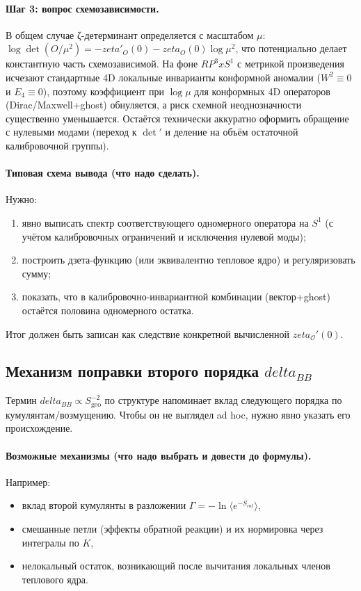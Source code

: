 \documentclass[12pt]{article}
\def\mathbb#1{#1}%
\def\delta{delta}%
\def\times{x}%
\def\zeta{zeta}%
\begin{document}
\paragraph{Шаг 3: вопрос схемозависимости.}
В общем случае ζ-детерминант определяется с масштабом $\mu$:
$\log\det(O/\mu^2)=-\zeta'_O(0)-\zeta_O(0)\log\mu^2$, что потенциально делает константную часть схемозависимой.
На фоне $\mathbb{RP}^3\times S^1$ с метрикой произведения исчезают стандартные 4D локальные инварианты конформной аномалии ($W^2\equiv 0$ и $E_4\equiv 0$), поэтому коэффициент при $\log\mu$ для конформных 4D операторов (Dirac/Maxwell+ghost) обнуляется, а риск схемной неоднозначности существенно уменьшается.
Остаётся технически аккуратно оформить обращение с нулевыми модами (переход к $\det'$ и деление на объём остаточной калибровочной группы).



\paragraph{Типовая схема вывода (что надо сделать).}
Нужно:
\begin{enumerate}
  \item явно выписать спектр соответствующего одномерного оператора на $S^1$ (с учётом калибровочных ограничений и исключения нулевой моды);
  \item построить дзета-функцию (или эквивалентно тепловое ядро) и регуляризовать сумму;
  \item показать, что в калибровочно-инвариантной комбинации (вектор+ghost) остаётся половина одномерного остатка.
\end{enumerate}
Итог должен быть записан как следствие конкретной вычисленной $\zeta_{\mathcal{O}}'(0)$.

\subsection{Механизм поправки второго порядка $\delta_{BB}$}
Термин $\delta_{BB}\propto S_{\mathrm{geo}}^{-2}$ по структуре напоминает вклад следующего порядка по кумулянтам/возмущению.
Чтобы он не выглядел ad hoc, нужно явно указать его происхождение.

\paragraph{Возможные механизмы (что надо выбрать и довести до формулы).}
Например:
\begin{itemize}
  \item вклад второй кумулянты в разложении $\Gamma=-\ln\langle e^{-S_{int}}\rangle$,
  \item смешанные петли (эффекты обратной реакции) и их нормировка через интегралы по $K$,
  \item нелокальный остаток, возникающий после вычитания локальных членов теплового ядра.
\end{itemize}
\end{document}

